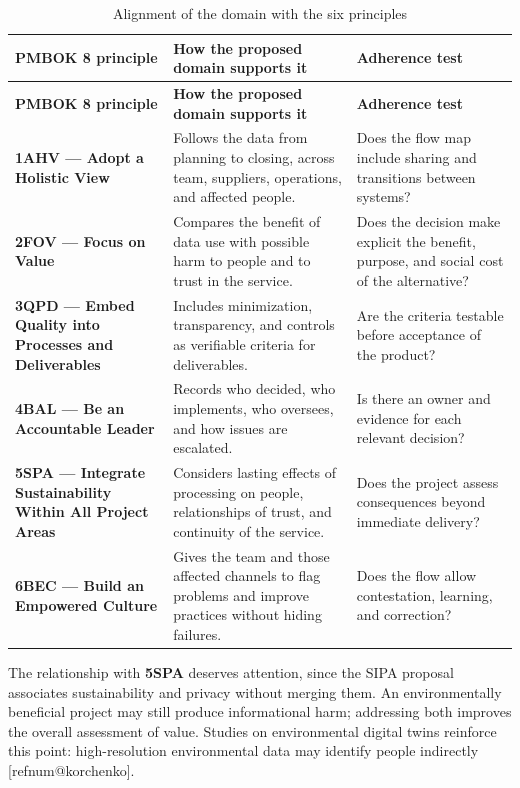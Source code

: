 \documentclass[12pt,a4paper,article,oneside,brazil,english]{abntex2}
\makeatletter
\newcommand{\fontetab}[1]{\par\vspace{3pt}{\small\noindent Source: #1\par}}
\newcommand{\refnum}[1]{\csname refnum@#1\endcsname}
\newcommand{\cit}[1]{[\refnum{#1}]}
\makeatother
\begin{document}
\begingroup\SingleSpacing\small
\begin{longtable}{@{}>{\raggedright\arraybackslash}p{}>{\raggedright\arraybackslash}p{}>{\raggedright\arraybackslash}p{}@{}}
\caption{Alignment of the domain with the six principles}\label{tab:t9}\\
\hline
\textbf{PMBOK 8 principle} & \textbf{How the proposed domain supports it} & \textbf{Adherence test}\\
\hline
\endfirsthead
\hline
\textbf{PMBOK 8 principle} & \textbf{How the proposed domain supports it} & \textbf{Adherence test}\\
\hline
\endhead
\hline
\endfoot
\hline
\endlastfoot
\textbf{1AHV — Adopt a Holistic View} & Follows the data from planning to closing, across team, suppliers, operations, and affected people. & Does the flow map include sharing and transitions between systems?\\[3pt]
\textbf{2FOV — Focus on Value} & Compares the benefit of data use with possible harm to people and to trust in the service. & Does the decision make explicit the benefit, purpose, and social cost of the alternative?\\[3pt]
\textbf{3QPD — Embed Quality into Processes and Deliverables} & Includes minimization, transparency, and controls as verifiable criteria for deliverables. & Are the criteria testable before acceptance of the product?\\[3pt]
\textbf{4BAL — Be an Accountable Leader} & Records who decided, who implements, who oversees, and how issues are escalated. & Is there an owner and evidence for each relevant decision?\\[3pt]
\textbf{5SPA — Integrate Sustainability Within All Project Areas} & Considers lasting effects of processing on people, relationships of trust, and continuity of the service. & Does the project assess consequences beyond immediate delivery?\\[3pt]
\textbf{6BEC — Build an Empowered Culture} & Gives the team and those affected channels to flag problems and improve practices without hiding failures. & Does the flow allow contestation, learning, and correction?\\[3pt]
\end{longtable}
\endgroup
\fontetab{Prepared by the authors (2026), based on \cit{pmi}.}

The relationship with \textbf{5SPA} deserves attention, since the SIPA proposal associates sustainability and privacy without merging them. An environmentally beneficial project may still produce informational harm; addressing both improves the overall assessment of value. Studies on environmental digital twins reinforce this point: high-resolution environmental data may identify people indirectly [\refnum{korchenko}].
\end{document}
